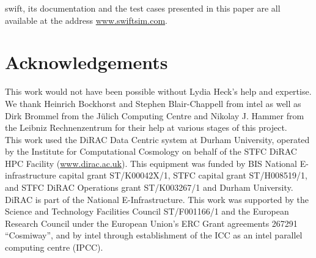 \documentclass{sig-alternate-05-2015}
\newcommand{\swift}{{\sc swift}\xspace}
\newcommand{\web}{\url{www.swiftsim.com}}
\begin{document}
\swift, its documentation and the test cases presented in this paper are all
available at the address \web.



\section{Acknowledgements}
This work would not have been possible without Lydia Heck's help and
expertise. We thank Heinrich Bockhorst and Stephen Blair-Chappell from
{\sc intel} as well as Dirk Brommel from the J\"ulich Computing Centre
and Nikolay J. Hammer from the Leibniz Rechnenzentrum for their help
at various stages of this project.\\ This work used the DiRAC Data
Centric system at Durham University, operated by the Institute for
Computational Cosmology on behalf of the STFC DiRAC HPC Facility
(\url{www.dirac.ac.uk}). This equipment was funded by BIS National
E-infrastructure capital grant ST/K00042X/1, STFC capital grant
ST/H008519/1, and STFC DiRAC Operations grant ST/K003267/1 and Durham
University. DiRAC is part of the National E-Infrastructure. This work
was supported by the Science and Technology Facilities Council
ST/F001166/1 and the European Research Council under the European
Union's ERC Grant agreements 267291 ``Cosmiway'', and by {\sc intel}
through establishment of the ICC as an {\sc intel} parallel computing
centre (IPCC).

\nocite{*}


\end{document}

